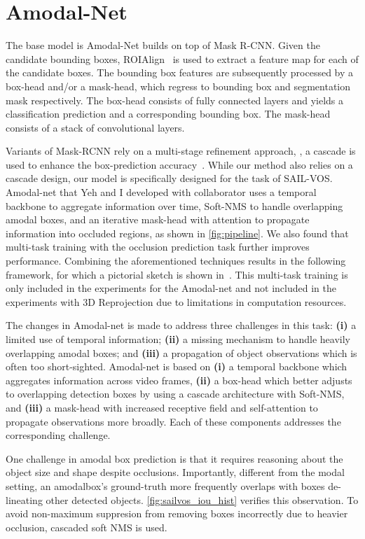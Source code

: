 \section{Amodal-Net}
The base model is Amodal-Net builds on top of Mask R-CNN\cite{he2017mask}. Given the candidate bounding boxes, ROIAlign~\cite{he2017mask} is used to extract a feature map for each of the candidate boxes. The bounding box features are subsequently processed by a box-head and/or a mask-head, which regress to bounding box and segmentation mask respectively. The box-head consists of fully connected layers and yields a classification prediction and a  corresponding bounding box.  %
The mask-head consists of a stack of convolutional layers. 

Variants of Mask-RCNN rely on a multi-stage refinement approach, \ie, a cascade is used to enhance the box-prediction accuracy~\cite{cai2018cascade, chen2019hybrid}. While our method also relies on a cascade design, our model is specifically designed for the task of SAIL-VOS. Amodal-net that Yeh and I developed with collaborator uses a temporal backbone to aggregate information over time, Soft-NMS to handle overlapping amodal boxes, and an iterative mask-head with attention to propagate information into occluded regions, as shown in \ref{fig:pipeline}. We also found that multi-task training with the occlusion prediction task further improves performance. Combining the aforementioned techniques results in the following framework, for which a pictorial sketch is shown in~. This multi-task training is only included in the experiments for the Amodal-net and not included in the experiments with 3D Reprojection due to limitations in computation resources.

The changes in Amodal-net is made to address three challenges in this task: {\bf (i)} a limited use of temporal information; {\bf (ii)} a missing mechanism to handle heavily overlapping amodal boxes; and {\bf (iii)} 
a propagation of object observations which is often too short-sighted. Amodal-net is based on {\bf (i)} a  temporal backbone which aggregates information across video frames, {\bf (ii)} a box-head which 
better adjusts to overlapping detection boxes by using a cascade architecture with  Soft-NMS, 
and {\bf (iii)} a mask-head with increased receptive field and self-attention to propagate observations more broadly. Each of these components addresses the corresponding  challenge. 

One challenge in amodal box prediction is that it requires reasoning about the object size and shape despite occlusions. Importantly, different from the modal setting, an amodalbox’s ground-truth more frequently overlaps with boxes de-lineating other detected objects. \ref{fig:sailvos_iou_hist} verifies this observation. To avoid non-maximum suppresion from removing boxes incorrectly due to heavier occlusion, cascaded soft NMS is used.

